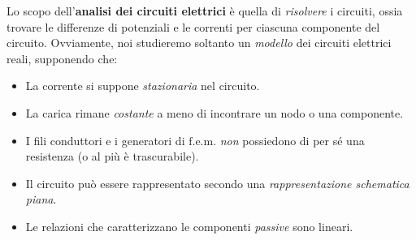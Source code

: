 Lo scopo dell'\textbf{analisi dei circuiti elettrici} è quella di \textit{risolvere} i circuiti, ossia trovare le differenze di potenziali e le correnti per ciascuna componente del circuito. Ovviamente, noi studieremo soltanto un \textit{modello} dei circuiti elettrici reali, supponendo che:
\begin{itemize}
	\item La corrente si suppone \textit{stazionaria} nel circuito.
	\item La carica rimane \textit{costante} a meno di incontrare un nodo o una componente.
	\item I fili conduttori e i generatori di $\textrm{f.e.m.}$ \textit{non} possiedono di per sé una resistenza (o al più è trascurabile).
	\item Il circuito può essere rappresentato secondo una \textit{rappresentazione schematica piana}.
	\item Le relazioni che caratterizzano le componenti \textit{passive} sono lineari.
\end{itemize}
